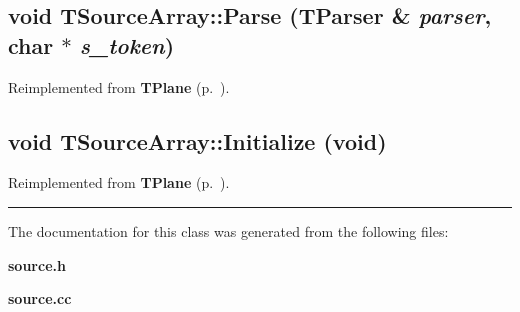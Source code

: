 \subsection{\setlength{\rightskip}{0pt plus 5cm}void TSource\-Array::Parse ({\bf TParser} \& {\em parser}, char $\ast$ {\em s\_\-token})\hspace{0.3cm}{\tt  [virtual]}}



Reimplemented from {\bf TPlane} {\rm (p.~\pageref{TPlane_a2})}.\label{TSourceArray_a2}
\subsection{\setlength{\rightskip}{0pt plus 5cm}void TSource\-Array::Initialize (void)\hspace{0.3cm}{\tt  [virtual]}}



Reimplemented from {\bf TPlane} {\rm (p.~\pageref{TPlane_a3})}.\vspace{0.4cm}\hrule\vspace{0.2cm}
The documentation for this class was generated from the following files:\begin{CompactItemize}
\item 
{\bf source.h}\item 
{\bf source.cc}\end{CompactItemize}
